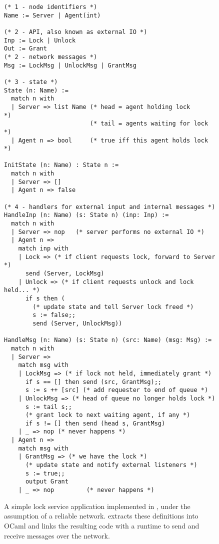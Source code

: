 
\begin{figure}[p]

\begin{lstlisting}[language=caml,basicstyle=\scriptsize\tt,morekeywords={output,send,nop}]
(* 1 - node identifiers *)
Name := Server | Agent(int)

(* 2 - API, also known as external IO *)
Inp := Lock | Unlock
Out := Grant
(* 2 - network messages *)
Msg := LockMsg | UnlockMsg | GrantMsg

(* 3 - state *)
State (n: Name) :=
  match n with
  | Server => list Name (* head = agent holding lock      *)
                        (* tail = agents waiting for lock *)
  | Agent n => bool     (* true iff this agent holds lock *)

InitState (n: Name) : State n :=
  match n with
  | Server => []
  | Agent n => false

(* 4 - handlers for external input and internal messages *)
HandleInp (n: Name) (s: State n) (inp: Inp) :=
  match n with
  | Server => nop   (* server performs no external IO *)
  | Agent n =>
    match inp with
    | Lock => (* if client requests lock, forward to Server *)
      send (Server, LockMsg)
    | Unlock => (* if client requests unlock and lock held... *)
      if s then (
        (* update state and tell Server lock freed *)
        s := false;;
        send (Server, UnlockMsg))

HandleMsg (n: Name) (s: State n) (src: Name) (msg: Msg) :=
  match n with
  | Server =>
    match msg with
    | LockMsg => (* if lock not held, immediately grant *)
      if s == [] then send (src, GrantMsg);;
      s := s ++ [src] (* add requester to end of queue *)
    | UnlockMsg => (* head of queue no longer holds lock *)
      s := tail s;;
      (* grant lock to next waiting agent, if any *)
      if s != [] then send (head s, GrantMsg)
    | _ => nop (* never happens *)
  | Agent n =>
    match msg with
    | GrantMsg => (* we have the lock *)
      (* update state and notify external listeners *)
      s := true;;
      output Grant
    | _ => nop         (* never happens *)
\end{lstlisting}

\caption{A simple lock service application implemented in \Verdi, under the
  assumption of a reliable network.  \Verdi extracts these definitions into
  OCaml and links the resulting code with a runtime to send and receive
  messages over the network.}
\label{fig:lock-service-code}
\end{figure}

